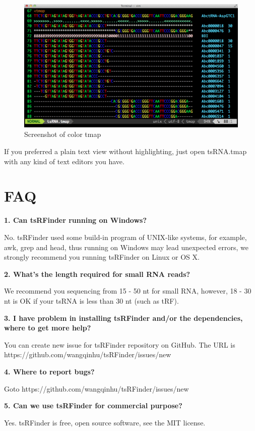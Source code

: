 \documentclass[11pt, a4paper]{article}
\begin{document}
\begin{figure}[htbp]
\begin{center}
\includegraphics[width=12cm]{tmap.png}
\caption{Screenshot of color tmap} 
\label{tmap}
\end{center}
\end{figure}

If you preferred a plain text view without highlighting, just open tsRNA.tmap with any kind of text editors you have.

\section{FAQ}

\textbf{1. Can tsRFinder running on Windows?}

No. tsRFinder used some build-in program of UNIX-like systems, for example, awk, grep and head, thus running on Windows may lead unexpected errors, we strongly recommend you running tsRFinder on Linux or OS X.

\textbf{2. What's the length required for small RNA reads?}

We recommend you sequencing from 15 - 50 nt for small RNA, however, 18 - 30 nt is OK if your tsRNA is less than 30 nt (such as tRF).

\textbf{3. I have problem in installing tsRFinder and/or the dependencies, where to get more help?}

You can create new issue for tsRFinder repository on GitHub. The URL is https://github.com/wangqinhu/tsRFinder/issues/new

\textbf{4. Where to report bugs?}

Goto https://github.com/wangqinhu/tsRFinder/issues/new

\textbf{5. Can we use tsRFinder for commercial purpose?}

Yes. tsRFinder is free, open source software, see the MIT license.
\end{document}
